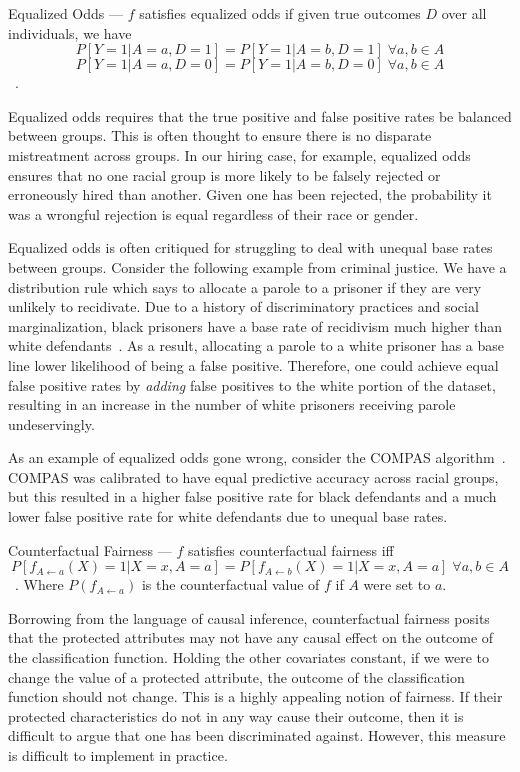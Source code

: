 \begin{definition}
    Equalized Odds — $f$ satisfies equalized odds if given true outcomes $D$
    over all individuals, we have
    \[P[Y=1|A=a, D=1] = P[Y=1|A=b, D=1]\;\forall a, b\in A\]
    \[P[Y=1|A=a, D=0] = P[Y=1|A=b, D=0]\;\forall a, b\in A\]~\citep{Hardt_2016}.
\end{definition}

Equalized odds requires that the true positive and false positive rates be
balanced between groups. This is often thought to ensure there is no disparate 
mistreatment across groups. In our hiring case, for example, equalized odds
ensures that no one racial group is more likely to be falsely rejected or
erroneously hired than another. Given one has been rejected, the probability it
was a wrongful rejection is equal regardless of their race or gender.

Equalized odds is often critiqued for struggling to deal with unequal base rates
between groups. Consider the following example from criminal justice. We have a 
distribution rule which says to allocate a parole to a prisoner if they are very
unlikely to recidivate. Due to a history of discriminatory practices and social
marginalization, black prisoners have a base rate of recidivism much higher than
white defendants~\citep{CrimeJustice_2023}. As a result, allocating a parole to 
a white prisoner has a base line lower likelihood of being a false positive. 
Therefore, one could achieve equal false positive rates by \textit{adding} false
positives to the white portion of the dataset, resulting in an increase in the
number of white prisoners receiving parole undeservingly. 

As an example of equalized odds gone wrong, consider the COMPAS
algorithm~\citep{Angwin_2016}. COMPAS was calibrated to have equal predictive
accuracy across racial groups, but this resulted in a higher false positive rate
for black defendants and a much lower false positive rate for white defendants
due to unequal base rates.

\begin{definition}
    Counterfactual Fairness — $f$ satisfies counterfactual fairness iff
    \[P[f_{A \leftarrow a}(X) = 1 | X = x, A = a] = P[f_{A\leftarrow b}(X) = 1 |
         X = x, A = a]\;\forall a, b \in A\]~\citep{Kusner_2018}.
    Where $P(f_{A \leftarrow a})$ is the counterfactual value of $f$ if $A$ were
    set to $a$.
\end{definition}

Borrowing from the language of causal inference, counterfactual fairness posits
that the protected attributes may not have any causal effect on the outcome of
the classification function. Holding the other covariates constant, if we were to
change the value of a protected attribute, the outcome of the classification
function should not change. This is a highly appealing notion of fairness.
If their protected characteristics do not in any way cause their outcome, then
it is difficult to argue that one has been discriminated against. However,
this measure is difficult to implement in practice.

